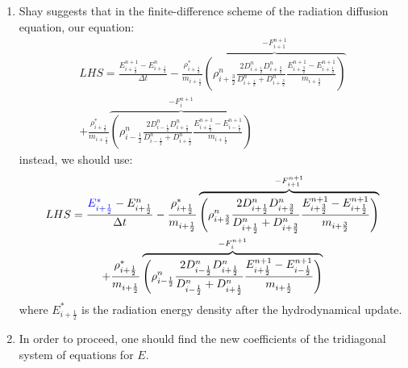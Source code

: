 \documentclass[11pt]{article}
\begin{document}
\begin{enumerate}
        \item Shay suggests that in the finite-difference scheme of the radiation diffusion equation, our equation:
        \begin{equation}
            \begin{gathered}
                LHS = \frac{E_{i+\frac{1}{2}}^{n+1} - E_{i+\frac{1}{2}}^n}{\Delta t} - \frac{\rho_{i+\frac{1}{2}}^{*}}{m_{i+\frac{1}{2}}} \overbrace{\left(\rho_{i+\frac{3}{2}}^n \frac{2D_{i+\frac{1}{2}}^{n} D_{i+\frac{3}{2}}^{n}}{D_{i+\frac{1}{2}}^{n} + D_{i+\frac{3}{2}}^{n}}\frac{E_{i+\frac{3}{2}}^{n+1} - E_{i+\frac{1}{2}}^{n+1}}{m_{i+\frac{3}{2}}}\right)}^{-F_{i+1}^{n+1}} \\ + \frac{\rho_{i+\frac{1}{2}}^{*}}{m_{i+\frac{1}{2}}}\overbrace{\left(\rho_{i-\frac{1}{2}}^n \frac{2D_{i-\frac{1}{2}}^{n} D_{i+\frac{1}{2}}^{n}}{D_{i-\frac{1}{2}}^{n} + D_{i+\frac{1}{2}}^{n}}\frac{E_{i+\frac{1}{2}}^{n+1} - E_{i-\frac{1}{2}}^{n+1}}{m_{i+\frac{1}{2}}}\right)}^{-F_{i}^{n+1}}
            \end{gathered}
        \end{equation}
        instead, we should use:
        \begin{equation}
            \begin{gathered}
                LHS = \frac{\textcolor{blue}{E_{i+\frac{1}{2}}^{*}} - E_{i+\frac{1}{2}}^n}{\Delta t} - \frac{\rho_{i+\frac{1}{2}}^{*}}{m_{i+\frac{1}{2}}} \overbrace{\left(\rho_{i+\frac{3}{2}}^n \frac{2D_{i+\frac{1}{2}}^{n} D_{i+\frac{3}{2}}^{n}}{D_{i+\frac{1}{2}}^{n} + D_{i+\frac{3}{2}}^{n}}\frac{E_{i+\frac{3}{2}}^{n+1} - E_{i+\frac{1}{2}}^{n+1}}{m_{i+\frac{3}{2}}}\right)}^{-F_{i+1}^{n+1}} \\ + \frac{\rho_{i+\frac{1}{2}}^{*}}{m_{i+\frac{1}{2}}}\overbrace{\left(\rho_{i-\frac{1}{2}}^n \frac{2D_{i-\frac{1}{2}}^{n} D_{i+\frac{1}{2}}^{n}}{D_{i-\frac{1}{2}}^{n} + D_{i+\frac{1}{2}}^{n}}\frac{E_{i+\frac{1}{2}}^{n+1} - E_{i-\frac{1}{2}}^{n+1}}{m_{i+\frac{1}{2}}}\right)}^{-F_{i}^{n+1}}
            \end{gathered}
        \end{equation}
        where $E_{i+\frac{1}{2}}^{*}$ is the radiation energy density after the hydrodynamical update.
        \item In order to proceed, one should find the new coefficients of the tridiagonal system of equations for $E$.
    \end{enumerate}
\end{document}
